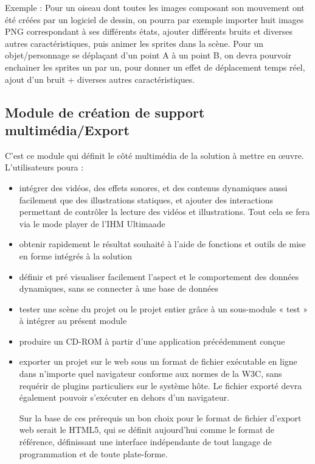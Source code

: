 \documentclass{ultimaade-fr}
\begin{document}
Exemple :
Pour un oiseau dont toutes les images composant son mouvement ont été créées par un logiciel de dessin, on pourra par exemple importer huit images PNG correspondant à ses différents états, ajouter différents  bruits et diverses autres caractéristiques, puis animer les sprites dans la scène.
Pour un objet/personnage se  déplaçant d’un point A à un point B, on devra pourvoir enchainer les  sprites un par un, pour donner un effet de déplacement temps réel, ajout d'un bruit + diverses autres caractéristiques.


\subsection{Module de création de support multimédia/Export}
C’est  ce  module  qui  définit  le  côté  multimédia  de  la  solution  à  mettre  en  œuvre.  L'utilisateurs poura :
\begin{itemize}
\item intégrer des vidéos, des effets sonores, et des contenus dynamiques aussi facilement que des illustrations statiques, et ajouter des interactions permettant de contrôler la lecture des  vidéos et illustrations. Tout cela se fera via le mode player de l’IHM Ultimaade
\item obtenir rapidement le résultat souhaité à l’aide de fonctions et outils de mise en forme intégrés à la solution
\item définir  et  pré  visualiser  facilement  l’aspect  et  le  comportement  des  données dynamiques, sans se connecter à une base de données
\item tester une scène du projet ou le projet entier grâce à un sous-module « test » à intégrer au présent module
\item produire un CD-ROM à partir d’une application précédemment conçue
\item exporter un projet sur le web sous un format de fichier exécutable en ligne dans n’importe  quel  navigateur  conforme  aux  normes  de  la  W3C,  sans  requérir  de
  plugins particuliers sur le système hôte. Le fichier exporté devra également pouvoir
  s’exécuter en dehors d’un navigateur.

  Sur la base de ces prérequis un bon choix pour le format de fichier d’export web serait le HTML5, qui se définit aujourd’hui comme le format de référence, définissant une interface indépendante de tout langage de programmation et de toute plate-forme.
\end{itemize}
\end{document}

